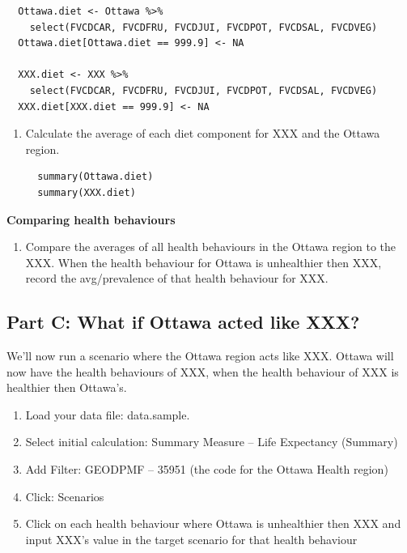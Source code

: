 \documentclass[]{book}
\providecommand{\tightlist}{%
  \setlength{\itemsep}{0pt}\setlength{\parskip}{0pt}}
\begin{document}
\begin{verbatim}
  Ottawa.diet <- Ottawa %>%
    select(FVCDCAR, FVCDFRU, FVCDJUI, FVCDPOT, FVCDSAL, FVCDVEG)
  Ottawa.diet[Ottawa.diet == 999.9] <- NA

  XXX.diet <- XXX %>%
    select(FVCDCAR, FVCDFRU, FVCDJUI, FVCDPOT, FVCDSAL, FVCDVEG)
  XXX.diet[XXX.diet == 999.9] <- NA
\end{verbatim}

\begin{enumerate}
\def\labelenumi{\alph{enumi}.}
\setcounter{enumi}{1}
\item
  Calculate the average of each diet component for XXX and the Ottawa
  region.

\begin{verbatim}
  summary(Ottawa.diet)
  summary(XXX.diet)
\end{verbatim}
\end{enumerate}

\textbf{Comparing health behaviours}

\begin{enumerate}
\def\labelenumi{\arabic{enumi}.}
\setcounter{enumi}{3}
\tightlist
\item
  Compare the averages of all health behaviours in the Ottawa region to
  the XXX. When the health behaviour for Ottawa is unhealthier then XXX,
  record the avg/prevalence of that health behaviour for XXX.
\end{enumerate}

\subsection{Part C: What if Ottawa acted like
XXX?}\label{part-c-what-if-ottawa-acted-like-xxx}

We'll now run a scenario where the Ottawa region acts like XXX. Ottawa
will now have the health behaviours of XXX, when the health behaviour of
XXX is healthier then Ottawa's.

\begin{enumerate}
\def\labelenumi{\arabic{enumi}.}
\item
  Load your data file: data.sample.
\item
  Select initial calculation: Summary Measure -- Life Expectancy
  (Summary)
\item
  Add Filter: GEODPMF -- 35951 (the code for the Ottawa Health region)
\item
  Click: Scenarios
\item
  Click on each health behaviour where Ottawa is unhealthier then XXX
  and input XXX's value in the target scenario for that health behaviour
\end{enumerate}
\end{document}
